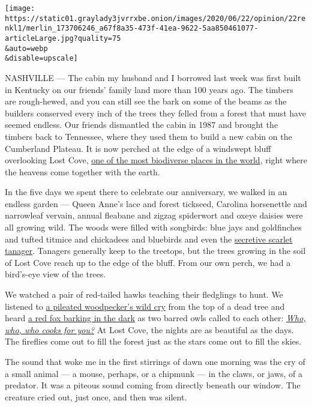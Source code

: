 \texttt{[image: https://static01.graylady3jvrrxbe.onion/images/2020/06/22/opinion/22renkl1/merlin\_173706246\_a67f8a35-473f-41ea-9622-5aa850461077-articleLarge.jpg?quality=75\\\&auto=webp\\\&disable=upscale]}

NASHVILLE --- The cabin my husband and I borrowed last week was first
built in Kentucky on our friends' family land more than 100 years ago.
The timbers are rough-hewed, and you can still see the bark on some of
the beams as the builders conserved every inch of the trees they felled
from a forest that must have seemed endless. Our friends dismantled the
cabin in 1987 and brought the timbers back to Tennessee, where they used
them to build a new cabin on the Cumberland Plateau. It is now perched
at the edge of a windswept bluff overlooking Lost Cove,
\href{https://www.landtrusttn.org/projects/lost-cove-sewanee-tn/}{one of
the most biodiverse places in the world}, right where the heavens come
together with the earth.

In the five days we spent there to celebrate our anniversary, we walked
in an endless garden --- Queen Anne's lace and forest tickseed, Carolina
horsenettle and narrowleaf vervain, annual fleabane and zigzag
spiderwort and oxeye daisies were all growing wild. The woods were
filled with songbirds: blue jays and goldfinches and tufted titmice and
chickadees and bluebirds and even the
\href{https://www.allaboutbirds.org/guide/Scarlet_Tanager/id}{secretive
scarlet tanager}. Tanagers generally keep to the treetops, but the trees
growing in the soil of Lost Cove reach up to the edge of the bluff. From
our own perch, we had a bird's-eye view of the trees.

We watched a pair of red-tailed hawks teaching their fledglings to hunt.
We listened to \href{https://www.youtube.com/watch?v=NqPPioNKIfo}{a
pileated woodpecker's wild cry} from the top of a dead tree and heard
\href{https://wildambience.com/wildlife-sounds/red-fox/}{a red fox
barking in the dark} as two barred owls called to each other:
\href{https://www.youtube.com/watch?v=y5zc-NHIipw}{\emph{Who, who, who
cooks for you?}} At Lost Cove, the nights are as beautiful as the days.
The fireflies come out to fill the forest just as the stars come out to
fill the skies.

The sound that woke me in the first stirrings of dawn one morning was
the cry of a small animal --- a mouse, perhaps, or a chipmunk --- in the
claws, or jaws, of a predator. It was a piteous sound coming from
directly beneath our window. The creature cried out, just once, and then
was silent.

